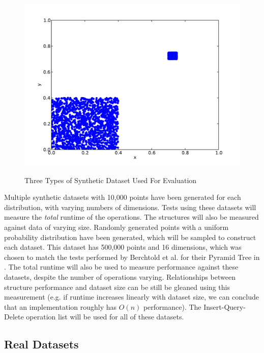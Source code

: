 \begin{figure}
\begin{center}
		\begin{subfloat} {%
			\includegraphics[scale=0.25]{figures/clustered_distribution.pdf}
		}
		\end{subfloat}
	\end{center}

	\caption{Three Types of Synthetic Dataset Used For Evaluation}
	\label{fig:synthetic-data}
\end{figure}

Multiple synthetic datasets with 10,000 points have been generated for each distribution, with varying numbers of dimensions. Tests using these datasets will measure the \textit{total} runtime of the operations. The structures will also be measured against data of varying size. Randomly generated points with a uniform probability distribution have been generated, which will be sampled to construct each dataset. This dataset has 500,000 points and 16 dimensions, which was chosen to match the tests performed by Berchtold et al. for their Pyramid Tree in \cite{pyramid-tree}. The total runtime will also be used to measure performance against these datasets, despite the number of operations varying. Relationships between structure performance and dataset size can be still be gleaned using this measurement (e.g. if runtime increases linearly with dataset size, we can conclude that an implementation roughly has $O(n)$ performance). The Insert-Query-Delete operation list will be used for all of these datasets. 

\subsection{Real Datasets}

